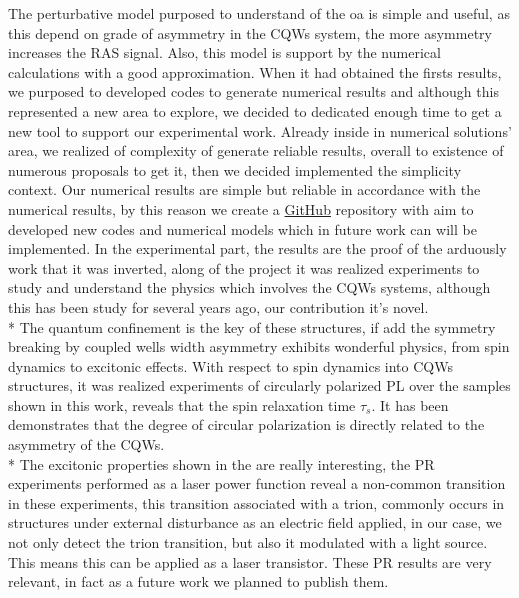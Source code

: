 The perturbative model purposed to understand of the \gls{oa} is simple and useful, as this depend on grade of asymmetry in the CQWs system, the more asymmetry increases the RAS signal. Also, this model is support by the numerical calculations with a good approximation. When it had obtained the firsts results, we purposed to developed  codes to generate numerical results and although this represented a new area to explore, we decided to dedicated enough time to get a new tool to support our experimental work. Already inside in numerical solutions' area, we realized of complexity of  generate reliable results, overall to existence of numerous proposals to get it, then we decided implemented the simplicity context. Our numerical results are simple but  reliable in accordance with the numerical results, by this reason we create a \href{https://github.com/lflmgroup}{GitHub} repository\cite{lflmgroup} with aim to developed new codes and numerical models which in future work can will be implemented. In the experimental part, the results are the proof of the arduously work that it was inverted, along of the project it was realized experiments to study and understand the physics which involves the \gls{CQWs} systems, although this has been study for several years ago, our contribution it's novel. \\*
The quantum confinement is the key of these structures, if add the symmetry breaking by coupled wells width asymmetry exhibits wonderful physics, from spin dynamics to excitonic effects. With respect to spin dynamics into CQWs structures, it was realized experiments of circularly polarized PL over the samples shown in this work, reveals that the spin relaxation time $\tau_{s}$. It has been demonstrates that the degree of circular polarization is directly related to the asymmetry of the \gls{CQWs}\cite{bravo2022photoluminiscence}. \\*
The excitonic properties shown in the  are really interesting, the \gls{PR} experiments performed as a laser power function reveal a non-common transition in these experiments, this transition associated with a trion, commonly occurs in structures under external disturbance as an electric field applied, in our case, we not only detect the trion transition, but also it modulated with a light source.  This means this can be applied as a laser transistor. These  PR results are very relevant, in fact as a future work we planned to publish them. 

